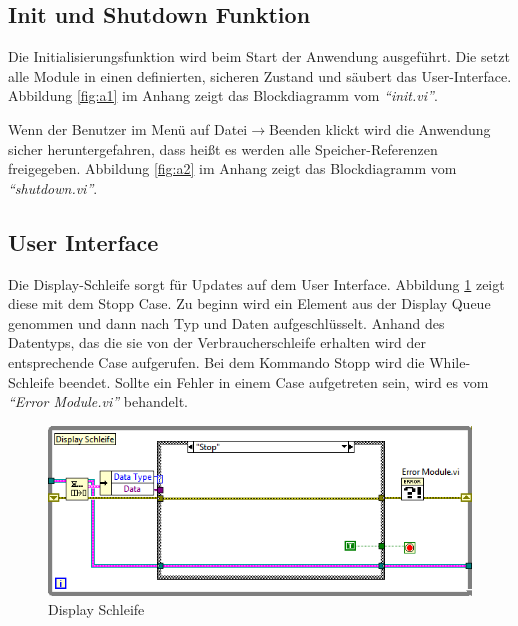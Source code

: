 		
		

\subsection{Init und Shutdown Funktion}	%
Die Initialisierungsfunktion wird beim Start der Anwendung ausgeführt. Die setzt alle Module in einen definierten, sicheren Zustand und säubert das User-Interface. Abbildung \ref{fig:a1} im Anhang zeigt das Blockdiagramm vom \textit{"`init.vi"'}.

Wenn der Benutzer im Menü auf Datei$\rightarrow$Beenden klickt wird die Anwendung sicher heruntergefahren, dass heißt es werden alle Speicher-Referenzen freigegeben. Abbildung \ref{fig:a2} im Anhang zeigt das Blockdiagramm vom \textit{"`shutdown.vi"'}.

\subsection{User Interface}
Die Display-Schleife sorgt für Updates auf dem User Interface.  Abbildung \ref{fig:disp} zeigt diese mit dem Stopp Case. Zu beginn wird ein Element aus der Display Queue genommen und dann nach Typ und Daten aufgeschlüsselt. Anhand des Datentyps, das die sie von der Verbraucherschleife erhalten wird der entsprechende Case aufgerufen. Bei dem Kommando Stopp wird die While-Schleife beendet. Sollte ein Fehler in einem Case aufgetreten sein, wird es vom \textit{"`Error Module.vi"'} behandelt.

	\begin{figure}[h!]
	\centering
		\includegraphics[width=\textwidth]{Pics/front-stop.png}
	\caption{Display Schleife}
	\label{fig:disp}
	\end{figure}

